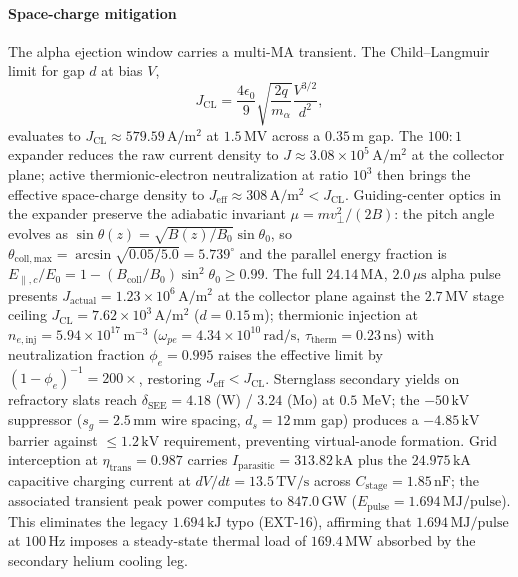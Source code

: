 \documentclass[11pt,journal,compsoc]{IEEEtran}
\newcommand{\MeV}{\,\mathrm{MeV}}
\begin{document}
\paragraph{Space-charge mitigation}
The alpha ejection window carries a multi-MA transient. The
Child--Langmuir \cite{childlangmuir} limit for gap $d$ at bias $V$,
\begin{equation}
J_{\mathrm{CL}} = \frac{4\epsilon_0}{9}\sqrt{\frac{2q}{m_\alpha}}
                 \frac{V^{3/2}}{d^2},
\label{eq:cl}
\end{equation}
evaluates to $J_{\mathrm{CL}} \approx 579.59\,\mathrm{A/m^2}$ at
$1.5\,\mathrm{MV}$ across a $0.35\,\mathrm{m}$ gap. The $100{:}1$ expander
reduces the raw current density to $J \approx 3.08\times10^{5}\,
\mathrm{A/m^2}$ at the collector plane; active thermionic-electron
neutralization at ratio $10^3$ then brings the effective space-charge
density to $J_{\mathrm{eff}} \approx 308\,\mathrm{A/m^2} < J_{\mathrm{CL}}$.
Guiding-center optics in the expander preserve the adiabatic invariant
$\mu = mv_\perp^2/(2B)$: the pitch angle evolves as
$\sin\theta(z) = \sqrt{B(z)/B_0}\sin\theta_0$, so $\theta_{\mathrm{
coll,max}} = \arcsin\sqrt{0.05/5.0} = 5.739^{\circ}$ and the parallel
energy fraction is $E_{\parallel,c}/E_0 = 1 -
(B_{\mathrm{coll}}/B_0)\sin^2\theta_0 \ge 0.99$. The full $24.14\,
\mathrm{MA}$, $2.0\,\mu\mathrm{s}$ alpha pulse presents
$J_{\mathrm{actual}} = 1.23\times10^{6}\,\mathrm{A/m^2}$ at the
collector plane against the $2.7\,\mathrm{MV}$ stage ceiling
$J_{\mathrm{CL}} = 7.62\times10^{3}\,\mathrm{A/m^2}$ ($d = 0.15\,
\mathrm{m}$); thermionic injection at $n_{e,\mathrm{inj}} = 5.94\times
10^{17}\,\mathrm{m^{-3}}$ ($\omega_{pe} = 4.34\times10^{10}\,
\mathrm{rad/s}$, $\tau_{\mathrm{therm}} = 0.23\,\mathrm{ns}$) with
neutralization fraction $\phi_e = 0.995$ raises the effective limit by
$(1-\phi_e)^{-1} = 200\times$, restoring $J_{\mathrm{eff}} <
J_{\mathrm{CL}}$. Sternglass secondary yields on refractory slats reach
$\delta_{\mathrm{SEE}} = 4.18$ (W) / $3.24$ (Mo) at $0.5\,\MeV$; the
$-50\,\mathrm{kV}$ suppressor ($s_g = 2.5\,\mathrm{mm}$ wire spacing,
$d_s = 12\,\mathrm{mm}$ gap) produces a $-4.85\,\mathrm{kV}$ barrier
against $\le 1.2\,\mathrm{kV}$ requirement, preventing virtual-anode
formation. Grid interception at $\eta_{\mathrm{trans}} = 0.987$ carries
$I_{\mathrm{parasitic}} = 313.82\,\mathrm{kA}$ plus the $24.975\,
\mathrm{kA}$ capacitive charging current at $dV/dt = 13.5\,
\mathrm{TV/s}$ across $C_{\mathrm{stage}} = 1.85\,\mathrm{nF}$; the
associated transient peak power computes to $847.0\,\mathrm{GW}$
($E_{\mathrm{pulse}} = 1.694\,\mathrm{MJ/pulse}$). This eliminates the
legacy $1.694\,\mathrm{kJ}$ typo (EXT-16), affirming that
$1.694\,\mathrm{MJ/pulse}$ at $100\,\mathrm{Hz}$ imposes a steady-state
thermal load of $169.4\,\mathrm{MW}$ absorbed by the secondary helium
cooling leg.
\end{document}
